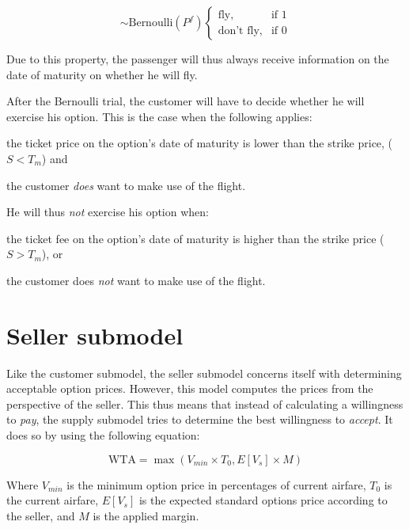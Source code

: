 \begin{equation}
\sim \mbox{Bernoulli}(P^f)\begin{cases}
     \mbox{fly}, & \mbox{if } 1 \\
    \mbox{don't fly}, & \mbox{if } 0 \end{cases}
\end{equation}

Due to this property, the passenger will thus always receive information on the date of maturity on whether he will fly.

After the Bernoulli trial, the customer will have to decide whether he will exercise his option. This is the case when the following applies:
\begin{compactitem}
    \item the ticket price on the option's date of maturity is lower than the strike price, ($S < T_m$) and
    \item the customer \emph{does} want to make use of the flight.
\end{compactitem}

He will thus \emph{not} exercise his option when:
\begin{compactitem}
    \item the ticket fee on the option's date of maturity is higher than the strike price ($S > T_m$), or
    \item the customer does \emph{not} want to make use of the flight.
\end{compactitem}



\section{Seller submodel}
\label{sec:sellerSubmodel}
Like the customer submodel, the seller submodel concerns itself with determining acceptable option prices. However, this model computes the prices from the perspective of the seller. This thus means that instead of calculating a willingness to \emph{pay}, the supply submodel tries to determine the best willingness to \emph{accept}. It does so by using the following equation:

$$ \mbox{WTA} = \max(V_{min} \times T_0, E[V_s] \times M) $$

Where $V_{min}$ is the minimum option price in percentages of current airfare, $T_0$ is the current airfare, $E[V_s]$ is the expected standard options price according to the seller, and $M$ is the applied margin.

